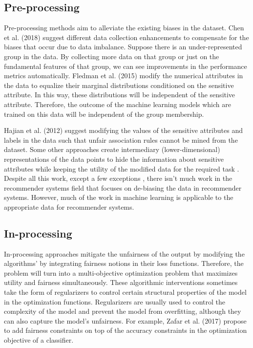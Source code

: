     \subsection{Pre-processing}
        Pre-processing methods aim to alleviate the existing biases in the dataset. Chen et al. (2018) \cite{chen2018why} suggest different data collection enhancements to compensate for the biases that occur due to data imbalance. Suppose there is an under-represented group in the data. By collecting more data on that group or just on the fundamental features of that group, we can see improvements in the performance metrics automatically. Fledman et al. (2015) \cite{Feldman2015} modify the numerical attributes in the data to equalize their marginal distributions conditioned on the sensitive attribute. In this way, these distributions will be independent of the sensitive attribute. Therefore, the outcome of the machine learning models which are trained on this data will be independent of the group membership. 
        
        Hajian et al. (2012) \cite{hajian2012methodology} suggest modifying the values of the sensitive attributes and labels in the data such that unfair association rules cannot be mined from the dataset. Some other approaches create intermediary (lower-dimensional) representations of the data points to hide the information about sensitive attributes while keeping the utility of the modified data for the required task \cite{zemel2013learning,lahoti2019ifair}. Despite all this work, except a few exceptions \cite{ekstrand2018all}, there isn't much work in the recommender systems field that focuses on de-biasing the data in recommender systems. However, much of the work in machine learning is applicable to the appropriate data for recommender systems. 

    \subsection{In-processing}

        In-processing approaches mitigate the unfairness of the output by modifying the algorithms' by integrating fairness notions in their loss functions. Therefore, the problem will turn into a multi-objective optimization problem that maximizes utility and fairness simultaneously. These algorithmic interventions sometimes take the form of regularizers to control certain structural properties of the model in the optimization functions. Regularizers are usually used to control the complexity of the model and prevent the model from overfitting, although they can also capture the model's unfairness. For example, Zafar et al. (2017) \cite{zafar2017fairness} propose to add fairness constraints on top of the accuracy constraints in the optimization objective of a classifier. 
        
